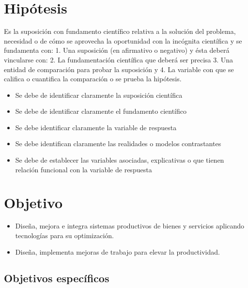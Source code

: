     \section{Hipótesis}
    
    Es la suposición con fundamento científico relativa a la solución del problema, necesidad o de cómo se aprovecha la oportunidad con la incógnita científica y se fundamenta con: 1. Una suposición (en afirmativo o negativo) y ésta deberá vincularse con:
    2. La fundamentación científica que deberá ser precisa 3. Una entidad de comparación para probar la suposición y
    4. La variable con que se califica o cuantifica la comparación o se prueba la hipótesis.
    
    \begin{itemize}
     \item Se debe de identificar claramente la suposición científica
    \item Se debe de identificar claramente el fundamento científico
    \item Se debe identificar claramente la variable de respuesta
    \item Se debe identifican claramente las realidades o modelos contrastantes
    \item Se debe de establecer las variables asociadas, explicativas o que tienen relación funcional con la variable de respuesta
    \end{itemize}
    \section{Objetivo}
    
    \begin{itemize}
        \item Diseña, mejora e integra sistemas productivos de bienes y servicios aplicando tecnologías para su optimización.
        \item Diseña, implementa mejoras de trabajo para elevar la productividad.
    \end{itemize}
    
    \subsection{Objetivos específicos }
    
